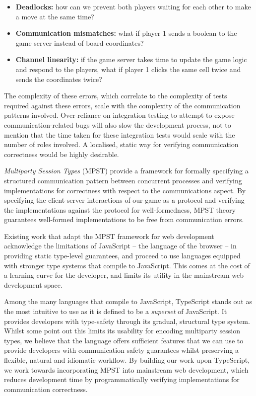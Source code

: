 \begin{itemize}

\item
\textbf{Deadlocks:} how can we prevent both players waiting for 
each other to make a move at the same time?

\item 
\textbf{Communication mismatches:} what if player 1 sends
a boolean to the game server instead of board coordinates?

\item
\textbf{Channel linearity:} if the game server takes time
to update the game logic and respond to the players, what if 
player 1 clicks the same cell twice and sends the coordinates twice?

\end{itemize}

The complexity of these errors, which correlate to the complexity of tests 
required against these errors, scale with the complexity of the 
communication patterns involved. Over-reliance on integration testing
to attempt to expose communication-related bugs will also slow the
development process, not to mention that the time taken for these
integration tests would scale with the number of roles involved.
A localised, static way for verifying communication correctness would
be highly desirable.

\textit{Multiparty Session Types} (MPST) \cite{MPST} provide 
a framework for formally specifying a structured communication pattern 
between concurrent processes and verifying implementations for 
correctness with respect to the communications aspect. 
By specifying the client-server interactions of our game as a protocol 
and verifying the implementations against the protocol for well-formedness, 
MPST theory guarantees well-formed implementations to be 
free from communication errors.

Existing work \cite{MVU2020,PureScript2019} that 
adapt the MPST framework for web development
acknowledge the limitations of JavaScript -- the language of the browser --
in providing static type-level guarantees, and proceed to use
languages equipped with stronger type systems that compile to JavaScript.
This comes at the cost of a learning curve for the developer,
and limits its utility in the mainstream web development space.

Among the many languages that compile to JavaScript,
TypeScript stands out as the most intuitive to use as it is defined
to be a \textit{superset} of JavaScript. It provides developers
with type-safety through its gradual, structural type system.
Whilst some \cite{MVU2020} point out this limits its usability for
encoding multiparty session types, we believe that the language
offers sufficient features that we can use to provide developers with
communication safety guarantees whilst preserving a flexible, natural
and idiomatic workflow. By building our work upon TypeScript, we
work towards incorporating MPST into mainstream web development,
which reduces development time by programmatically verifying 
implementations for communication correctness.